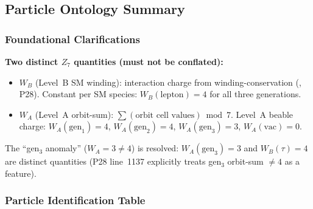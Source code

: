\subsection{Particle Ontology Summary}
\label{sec:mi-ontology}

\subsubsection{Foundational Clarifications}
\label{sec:mi-ontology-clarifications}

\noindent\textbf{Two distinct $Z_7$ quantities (must not be conflated):}
\begin{itemize}
\item $W_B$ (Level~B SM winding): interaction charge from winding-conservation (\CatAL, P28).
  Constant per SM species: $W_B(\text{lepton}) = 4$ for all three generations.
\item $W_A$ (Level~A orbit-sum): $\sum(\text{orbit cell values}) \bmod 7$.
  Level~A beable charge: $W_A(\text{gen}_1) = 4$, $W_A(\text{gen}_2) = 4$,
  $W_A(\text{gen}_3) = 3$, $W_A(\text{vac}) = 0$.
\end{itemize}

\noindent The ``gen$_3$ anomaly'' ($W_A = 3 \neq 4$) is resolved: $W_A(\text{gen}_3) = 3$
and $W_B(\tau) = 4$ are distinct quantities (P28 line~1137 explicitly treats
gen$_3$ orbit-sum $\neq 4$ as a feature).

\subsubsection{Particle Identification Table}
\label{sec:mi-ontology-table}

